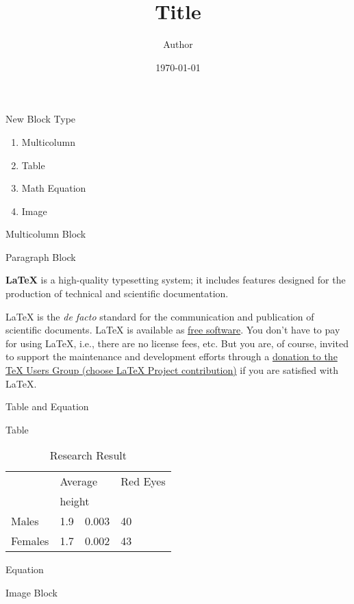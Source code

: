 \documentclass{beamer}
\title{Title}
\author{Author}
\date{\today}
\begin{document}
\maketitle
\begin{frame}{New Block Type}

{
\begin{enumerate}
\item
  Multicolumn
\item
  Table
\item
  Math Equation
\item
  Image
\end{enumerate}
}

\end{frame}
\begin{frame}{Multicolumn Block}

\begin{block}{Paragraph Block}

{
\textbf{LaTeX} is a high-quality typesetting system; it
includes features designed for the production of technical and
scientific documentation.
}

\end{block}
\begin{multicols}{2}
LaTeX is the \emph{de facto} standard for the communication and
publication of scientific documents. LaTeX is available as
\href{https://www.latex-project.org/lppl/}{free software}. You don't
have to pay for using LaTeX, i.e., there are no license fees, etc. But
you are, of course, invited to support the maintenance and development
efforts through a \href{https://www.tug.org/donate.html}{donation to the
TeX Users Group (choose LaTeX Project contribution)} if you are
satisfied with LaTeX.

\end{multicols}
\end{frame}
\begin{frame}{Table and Equation}

\begin{alertblock}{Table}

\begin{table}[h]\centering
\begin{tabular}{|l|l|l|l|}\hline
\multirow{2}{*}{}&\multicolumn{2}{|l|}{Average}&Red Eyes\\\cline{2-2}\cline{3-3}\cline{4-4}
\multirow{2}{*}{ }&\multicolumn{2}{|l|}{height}&\\\hline
Males&1.9&0.003&40\\\hline
Females&1.7&0.002&43\\\hline
\end{tabular}
\caption{Research Result}
\end{table}

\end{alertblock}
\begin{exampleblock}{Equation}

\end{exampleblock}
\end{frame}
\begin{frame}{Image Block}

\end{frame}
\end{document}
